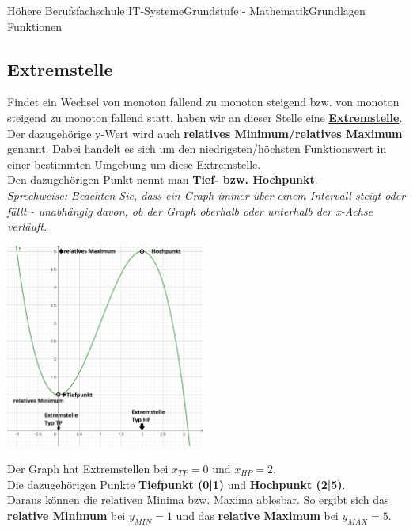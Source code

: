 \documentclass[11pt,twocolumn,oneside,openany,headings=optiontotoc,11pt,numbers=noenddot]{article}
\begin{document}
\begin{worksheet}{Höhere Berufsfachschule IT-Systeme}{Grundstufe - Mathematik}{Grundlagen Funktionen}
		\subsection*{Extremstelle}
		Findet ein Wechsel von monoton fallend zu monoton steigend bzw. von monoton steigend zu monoton fallend statt, haben wir an dieser Stelle eine \underline{\textbf{Extremstelle}}.\\
		Der dazugehörige \underline{y-Wert} wird auch \underline{\textbf{relatives Minimum/relatives Maximum}} genannt. Dabei handelt es sich um den niedrigsten/höchsten Funktionswert in einer bestimmten Umgebung um diese Extremstelle.\\
		Den dazugehörigen Punkt nennt man \textbf{\underline{Tief- bzw. Hochpunkt}}.\\
		\textit{Sprechweise: Beachten Sie, dass ein Graph immer \underline{über} einem Intervall steigt oder fällt - unabhängig davon, ob der Graph oberhalb oder unterhalb der x-Achse verläuft.}\\
		\par\bigskip\noindent
		\includegraphics[width=0.49\textwidth]{../99_Bilder/EP.png}\\
		\par\bigskip\noindent
		Der Graph hat Extremstellen bei \(x_{TP} = 0\) und \(x_{HP} = 2\).\\
		Die dazugehörigen Punkte \textbf{Tiefpunkt (0|1)} und \textbf{Hochpunkt (2|5)}.\\
		Daraus können die relativen Minima bzw. Maxima ablesbar. So ergibt sich das \textbf{relative Minimum} bei \( y_{MIN} = 1\) und das \textbf{relative Maximum} bei \(y_{MAX} = 5\).

\end{worksheet}
\end{document}
